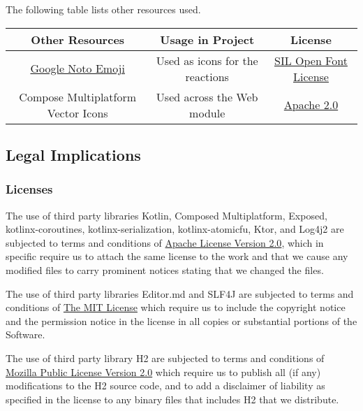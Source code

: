 \documentclass[a4paper]{article}
\begin{document}
    The following table lists other resources used.

    \begin{table}[H]
        \begin{tabular}{c|c|c}
            Other Resources                                                             & Usage in Project                & License                                                                                         \\
            \hline
            \href{https://fonts.google.com/noto/specimen/Noto+Emoji}{Google Noto Emoji} & Used as icons for the reactions & \href{https://scripts.sil.org/cms/scripts/page.php?site_id=nrsi\&           id=OFL}{SIL Open Font License} \\
            Compose Multiplatform Vector Icons                                          & Used across the Web module      & \href{https://github.com/JetBrains/compose-multiplatform/blob/master/LICENSE.txt}{Apache 2.0}   \\
        \end{tabular}
    \end{table}

    \subsection*{Legal Implications}

    \subsubsection*{Licenses}

    The use of third party libraries Kotlin, Composed Multiplatform, Exposed, kotlinx-coroutines, kotlinx-serialization, kotlinx-atomicfu, Ktor, and Log4j2 are subjected to terms and conditions of \href{http://www.apache.org/licenses/LICENSE-2.0}{Apache License Version 2.0}, which in specific require us to attach the same license to the work and that we cause any modified files to carry prominent notices stating that we changed the files.

    The use of third party libraries Editor.md and SLF4J are subjected to terms and conditions of \href{https://mit-license.org/}{The MIT License} which require us to include the copyright notice and the permission notice in the license in all copies or substantial portions of the Software.

    The use of third party library H2 are subjected to terms and conditions of \href{https://www.mozilla.org/en-US/MPL/2.0/}{Mozilla Public License Version 2.0} which require us to publish all (if any) modifications to the H2 source code, and to add a disclaimer of liability as specified in the license to any binary files that includes H2 that we distribute.
\end{document}
